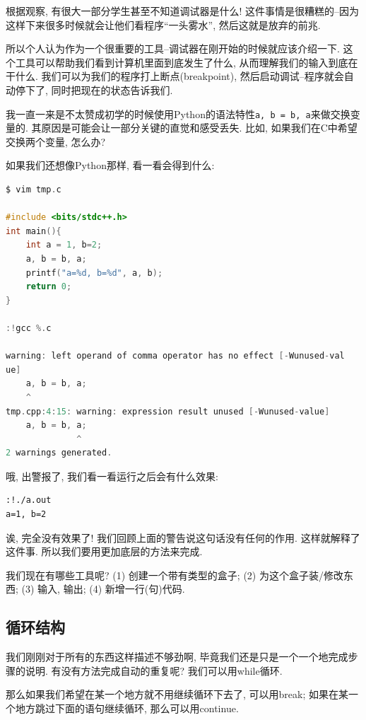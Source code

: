 \begin{tool}
	根据观察, 有很大一部分学生甚至不知道调试器是什么! 这件事情是很糟糕的--因为这样下来很多时候就会让他们看程序``一头雾水'', 然后这就是放弃的前兆. 

	所以个人认为作为一个很重要的工具--调试器在刚开始的时候就应该介绍一下. 这个工具可以帮助我们看到计算机里面到底发生了什么, 从而理解我们的输入到底在干什么. 我们可以为我们的程序打上断点(breakpoint), 然后启动调试--程序就会自动停下了, 同时把现在的状态告诉我们. 
\end{tool}



我一直一来是不太赞成初学的时候使用Python的语法特性\texttt{a, b = b, a}来做交换变量的. 其原因是可能会让一部分关键的直觉和感受丢失. 比如, 如果我们在C中希望交换两个变量, 怎么办? 

如果我们还想像Python那样, 看一看会得到什么: 

\begin{lstlisting}[language=c]	
$ vim tmp.c

#include <bits/stdc++.h>
int main(){
    int a = 1, b=2; 
    a, b = b, a;
    printf("a=%d, b=%d", a, b);
    return 0;
}

:!gcc %.c

warning: left operand of comma operator has no effect [-Wunused-val
ue]
    a, b = b, a;
    ^
tmp.cpp:4:15: warning: expression result unused [-Wunused-value]
    a, b = b, a;
              ^
2 warnings generated.
\end{lstlisting}

哦, 出警报了, 我们看一看运行之后会有什么效果: 

\begin{lstlisting}
:!./a.out
a=1, b=2
\end{lstlisting}

诶, 完全没有效果了! 我们回顾上面的警告说这句话没有任何的作用. 这样就解释了这件事. 所以我们要用更加底层的方法来完成. 

我们现在有哪些工具呢? (1) 创建一个带有类型的盒子; (2) 为这个盒子装/修改东西; (3) 输入, 输出; (4) 新增一行(句)代码. 


\subsection{循环结构}

我们刚刚对于所有的东西这样描述不够劲啊, 毕竟我们还是只是一个一个地完成步骤的说明. 有没有方法完成自动的重复呢? 我们可以用while循环. 

那么如果我们希望在某一个地方就不用继续循环下去了, 可以用break; 如果在某一个地方跳过下面的语句继续循环, 那么可以用continue. 

